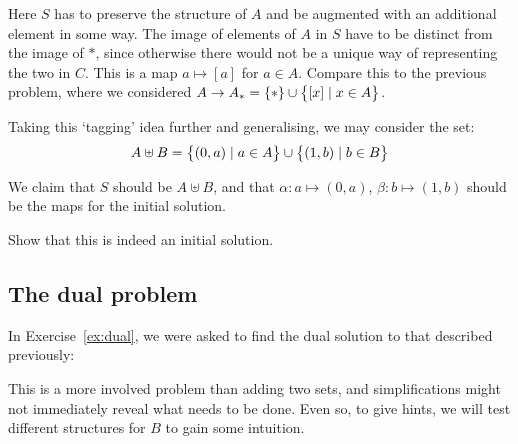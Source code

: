 \begin{center}
\end{center}

Here $S$ has to preserve the structure of $A$ and be augmented with an
additional element in some way. The image of elements of $A$ in $S$ have to be
distinct from the image of $\ast$, since otherwise there would not be a unique
way of representing the two in $C$. This is a map $a \mapsto [a]$ for $a \in A$.
Compare this to the previous problem, where we considered
$A \to A_\ast = \{ \ast \} \cup \big\{ [x] \mid x \in A \big\}$.

Taking this `tagging' idea further and generalising, we may consider the set:
\begin{equation*}
A \uplus B = \big\{ (0, a) \mid a \in A \big\} \cup
\big\{ (1, b) \mid b \in B \big\}
\end{equation*}

We claim that $S$ should be $A \uplus B$, and that $\alpha: a \mapsto (0, a)$,
$\beta: b \mapsto (1, b)$ should be the maps for the initial solution.

\begin{exercise}
Show that this is indeed an initial solution.
\end{exercise}

\subsection{The dual problem}

In Exercise~\ref{ex:dual}, we were asked to find the dual solution to that
described previously:
\begin{center}
\end{center}

This is a more involved problem than adding two sets, and simplifications might
not immediately reveal what needs to be done. Even so, to give hints, we will test
different structures for $B$ to gain some intuition.

